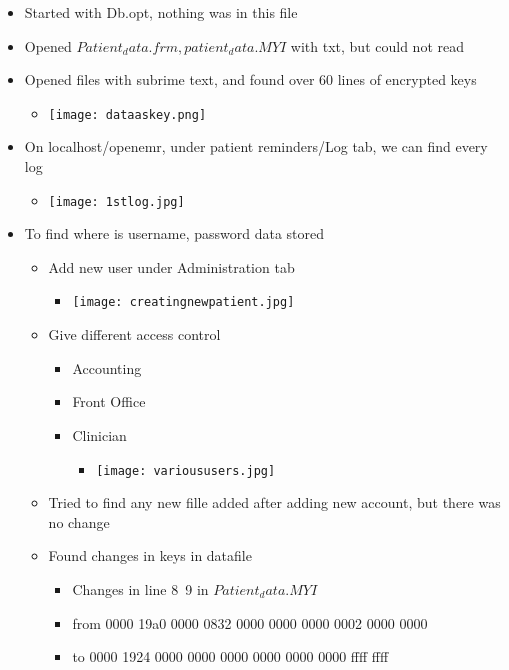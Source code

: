\documentclass[paper=a4, fontsize=11pt]{scrartcl} %
\numberwithin{equation}{section} %
\numberwithin{figure}{section} %
\numberwithin{table}{section} %
\begin{document}
\begin{itemize}
	\item Started with Db.opt, nothing was in this file
	\item Opened $Patient_data.frm,patient_data.MYI$ with txt, but could not read
	\item Opened files with subrime text, and found over 60 lines of encrypted keys
		\graphicspath {{C:/pictures/}}
		\begin{itemize}
		\item
		 \texttt{[image: dataaskey.png]}
		\end{itemize}
\vspace{2cm}
	\item On localhost/openemr, under patient reminders/Log tab, we can find every log
		\begin{itemize}
		\item
		\texttt{[image: 1stlog.jpg]}
		\end{itemize}
\vspace{2cm}
	\item To find where is username, password data stored
		\begin{itemize}
		\item Add new user under Administration tab
			\begin{itemize}
			\item
			 \texttt{[image: creatingnewpatient.jpg]}
		\end{itemize}
		\item Give different access control
			\begin{itemize}
				\item Accounting
				\item Front Office
				\item Clinician
					\begin{itemize}
						\item
						 \texttt{[image: varioususers.jpg]}
					\end{itemize}
			\end{itemize}
		
		\item Tried to find any new fille added after adding new account, but there was no change
		\item Found changes in keys in datafile
			\begin{itemize}
				\item Changes in line 8~9 in $Patient_data.MYI$
				\item from 0000 19a0 0000 0832 0000 0000 0000 0002 0000 0000
				\item to     0000 1924 0000 0000 0000 0000 0000 0000 ffff ffff
			\end{itemize}
\end{itemize}


\end{itemize}
\end{document}
